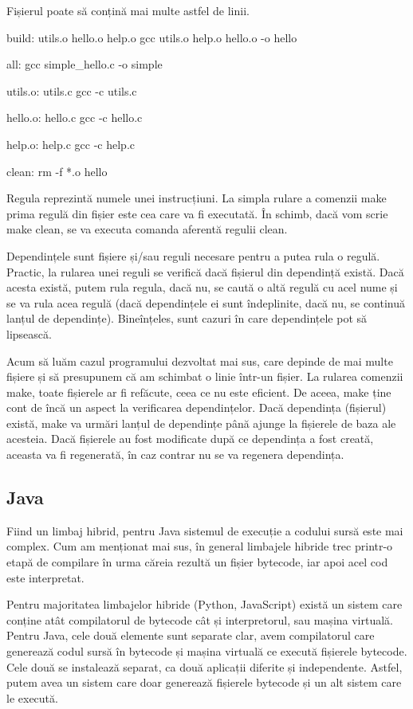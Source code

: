 Fișierul poate să conțină mai multe astfel de linii.

\begin{screen}[caption={Exemplu Makefile}]
build: utils.o hello.o help.o
       gcc utils.o help.o hello.o -o hello

all:
       gcc simple_hello.c -o simple

utils.o: utils.c
       gcc -c utils.c

hello.o: hello.c
       gcc -c hello.c

help.o: help.c
       gcc -c help.c

clean:
       rm -f *.o hello
\end{screen}

Regula reprezintă numele unei instrucțiuni. La simpla rulare a comenzii make
prima regulă din fișier este cea care va fi executată. În schimb, dacă vom scrie
make clean, se va executa comanda aferentă regulii clean.

Dependințele sunt fișiere și/sau reguli necesare pentru a putea rula o regulă.
Practic, la rularea unei reguli se verifică dacă fișierul din dependință există.
Dacă acesta există, putem rula regula, dacă nu, se caută o altă regulă cu acel
nume și se va rula acea regulă (dacă dependințele ei sunt îndeplinite, dacă nu,
se continuă lanțul de dependințe). Bineînțeles, sunt cazuri în care dependințele
pot să lipsească.

Acum să luăm cazul programului dezvoltat mai sus, care depinde de mai multe
fișiere și să presupunem că am schimbat o linie într-un fișier. La rularea
comenzii make, toate fișierele ar fi refăcute, ceea ce nu este eficient. De
aceea, make ține cont de încă un aspect la verificarea dependințelor. Dacă
dependința (fișierul) există, make va urmări lanțul de dependințe până ajunge la
fișierele de baza ale acesteia. Dacă fișierele au fost modificate după ce
dependința a fost creată, aceasta va fi regenerată, în caz contrar nu se va
regenera dependința.

\subsection{Java}
\label{sec:appdev-ideinstall-java}

Fiind un limbaj hibrid, pentru Java sistemul de execuție a codului sursă este
mai complex. Cum am menționat mai sus, în general limbajele hibride trec
printr-o etapă de compilare în urma căreia rezultă un fișier bytecode, iar apoi
acel cod este interpretat.

Pentru majoritatea limbajelor hibride (Python, JavaScript) există un sistem care
conține atât compilatorul de bytecode cât și interpretorul, sau mașina virtuală.
Pentru Java, cele două elemente sunt separate clar, avem compilatorul care
generează codul sursă în bytecode și mașina virtuală ce execută fișierele
bytecode. Cele două se instalează separat, ca două aplicații diferite și
independente. Astfel, putem avea un sistem care doar generează fișierele
bytecode și un alt sistem care le execută.

